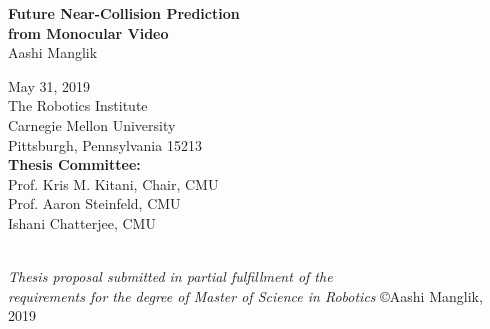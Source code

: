 \thispagestyle{empty}
\date{}

\begin{center}

{\Huge \bf Future Near-Collision Prediction \\ \vspace{0.5cm} from Monocular Video} \\
\vspace{1cm}  
{\Large Aashi Manglik} \\
\vspace{1cm} 


{\Large May 31, 2019} \\
\vspace{2cm}
{\Large
The Robotics Institute\\
Carnegie Mellon University\\
Pittsburgh, Pennsylvania 15213\\
}
\vspace{1cm}
{\Large
{\bf Thesis Committee:}\\
Prof. Kris M. Kitani, Chair, CMU \\
Prof. Aaron Steinfeld, CMU \\
Ishani Chatterjee, CMU \\
}
\vspace{2cm}
\par ~ \\
{\large \it Thesis proposal submitted in partial fulfillment of the \\
    requirements for the degree of Master of Science in Robotics}
\vfill
{\large \copyright Aashi Manglik, 2019}
\end{center}


